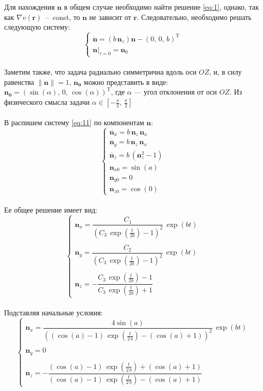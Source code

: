 \documentclass{article}
\newcommand{\bfv}[1]{\mathbf{#1}}
\newcommand{\dd}[1]{\dot{#1}}
\newcommand{\dv}[1]{\nabla v(#1)}
\newcommand{\T}[1]{#1^\mathrm{T}}
\begin{document}
Для нахождения $\bfv{n}$ в общем случае необходимо найти решение \eqref{eq:1}, однако, так как $\dv{\bfv{r}}$~--~const, то $\bfv{n}$ не зависит от $\bfv{r}$. Следовательно, необходимо решать следующую систему:
\begin{equation} \label{eq:11}
\begin{cases}
\dd{\bfv{n}} = (b\,\bfv{n}_z)\bfv{n} - \T{(0,\,0,\,b)}\\
\bfv{n}|_{\tau=0} = \bfv{n}_0
\end{cases}
\end{equation}\\
Заметим также, что задача радиально симметрична вдоль оси $OZ$, и, в силу равенства $\|\bfv{n}\| = 1$, $\bfv{n_0}$ можно представить в виде: $\bfv{n_0} = \T{(\sin(\alpha),\,0,\,\cos(\alpha))}$, где $\alpha$ --- угол отклонения от оси $OZ$. Из физического смысла задачи $\alpha \in [-\frac{\pi}{2},\,\frac{\pi}{2}]$\\\\
В распишем систему \eqref{eq:11} по компонентам $\bfv{n}$:
\begin{equation} \label{eq:12}
\begin{cases}
\dd{\bfv{n}_x} = b\,\bfv{n}_z\,\bfv{n}_x\\
\dd{\bfv{n}_y} = b\,\bfv{n}_z\,\bfv{n}_x\\
\dd{\bfv{n}_z} = b\,(\bfv{n}_z^2 - 1)\\
\bfv{n}_{x0} = \sin(a)\\
\bfv{n}_{y0} = 0\\
\bfv{n}_{z0} = \cos(0)
\end{cases}
\end{equation}\\
Ее общее решение имеет вид:
\begin{equation*}
\begin{cases}
\bfv{n}_x = \dfrac{C_1}{(C_3\,\exp(\frac{t}{2b}) - 1)^2}\,\exp(bt)\\\\
\bfv{n}_y = \dfrac{C_2}{(C_3\,\exp(\frac{t}{2b}) - 1)^2}\,\exp(bt)\\\\
\bfv{n}_z = -\dfrac{C_3\,\exp(\frac{t}{2b}) - 1}{C_3\,\exp(\frac{t}{2b}) + 1}
\end{cases}
\end{equation*}\\
Подставляя начальные условия:
\begin{equation} \label{eq:13}
\begin{cases}
\bfv{n}_x = \dfrac{4\sin(a)}{((\cos(a) - 1)\,\exp(\frac{t}{2\,b}) - (\cos(a) + 1))^2}\,\exp(bt)\\\\
\bfv{n}_y = 0\\\\
\bfv{n}_z = -\dfrac{(\cos(a) - 1)\,\exp(\frac{t}{2\,b}) + (\cos(a) + 1)}{(\cos(a) - 1)\,\exp(\frac{t}{2\,b}) - (\cos(a) + 1)}
\end{cases}
\end{equation}\\\\
\end{document}

